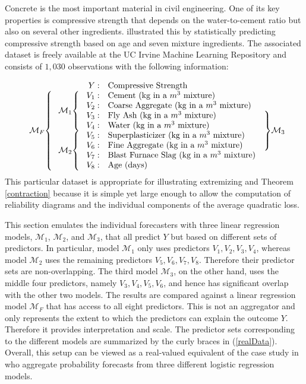 \documentclass[11pt]{article}
\theoremstyle{definition}
\theoremstyle{definition}
\begin{document}
Concrete is the most important material in civil engineering. One of its key properties is compressive strength that depends on the water-to-cement ratio but also on several other ingredients. \cite{yeh1998modeling} illustrated this by statistically predicting compressive strength based on age and seven mixture ingredients. The associated dataset is freely available at the UC Irvine Machine Learning Repository \citep{Lichman:2013} and consists of $1,030$ observations with the following information:

\begin{equation}
\begin{array}{ll r lr}
&&Y: & \text{Compressive Strength}&\\
\ldelim\{{8}{2.5em}[$\mathcal{M}_F$] &\ldelim\{{4}{2.5em}[$\mathcal{M}_1$] &V_1: &  \text{Cement (kg in a $m^3$ mixture)}&  \\
&&V_2: & \text{Coarse Aggregate (kg in a $m^3$ mixture)}&\\
  &&V_3: &  \text{Fly Ash (kg in a $m^3$ mixture)}&  \rdelim\}{4}{2em}[$\mathcal{M}_3$] \\
&&V_4: & \text{Water (kg in a $m^3$ mixture)}&\\
&\ldelim\{{4}{2.5em}[$\mathcal{M}_2$] &V_5: &  \text{Superplasticizer (kg in a $m^3$ mixture)}&  \\
&&V_6: & \text{Fine Aggregate  (kg in a $m^3$ mixture)}&\\
&&V_7: & \text{Blast Furnace Slag (kg in a $m^3$ mixture)}&\\
&&V_8: & \text{Age (days)}&
\end{array}\label{realData}
\end{equation}
\noindent
This particular dataset is appropriate for illustrating extremizing and Theorem \ref{contraction} because it is simple yet large enough to allow the computation of reliability diagrams and the individual components of the average quadratic loss.

 This section emulates the individual forecasters with three linear regression models, $\mathcal{M}_1$, $\mathcal{M}_2$, and $\mathcal{M}_3$, that all predict $Y$ but based on different sets of predictors. In particular, model $\mathcal{M}_1$ only uses predictors $V_1, V_2, V_3, V_4$, whereas model $\mathcal{M}_2$ uses the remaining predictors $V_5, V_6, V_7, V_8$. Therefore their predictor sets are non-overlapping. The third model $\mathcal{M}_3$, on the other hand, uses the middle four predictors, namely $V_3, V_4, V_5, V_6$, and hence has significant overlap with the other two models. The results are compared against a linear regression model $\mathcal{M}_F$ that has access to all eight predictors. This is not an aggregator and only represents the extent to which the predictors can explain the outcome $Y$. Therefore it provides interpretation and scale. The predictor sets corresponding to the different models are summarized by the curly braces in (\ref{realData}). Overall, this setup can be viewed as a real-valued equivalent of the case study in \cite{Ranjan08} who aggregate probability forecasts from three different logistic regression models. 
\end{document}
